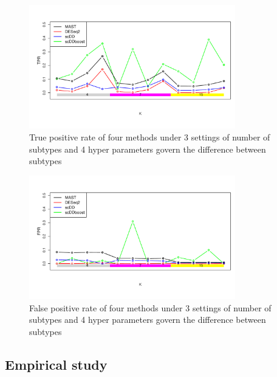 \documentclass[aoas,preprint]{imsart}
\begin{document}
\begin{figure}[H]
  \includegraphics[width = 0.8\textwidth]{Figs/simuTPR.pdf}
  \caption{True positive rate of four methods under 3 settings of number of subtypes and 4 hyper parameters govern the difference between subtypes}
  \label{fig:5}
\end{figure}


\begin{figure}[H]
  \includegraphics[width = 0.8\textwidth]{Figs/simuFPR.pdf}
  \caption{False positive rate of four methods under 3 settings of number of subtypes and 4 hyper parameters govern the difference between subtypes}
  \label{fig:5}
\end{figure}



\subsection{Empirical study}
\end{document}
